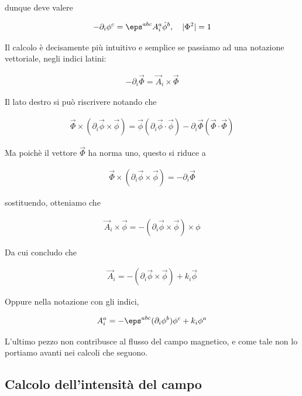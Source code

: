 \documentclass{report}
\begin{document}
dunque deve valere 

\begin{align}
    -\partial_i \phi^c = \eps^{abc}A^a_i \hat{\phi}^b, \quad |\Phi^2| = 1
\end{align}

Il calcolo è decisamente più intuitivo e semplice se passiamo ad una notazione vettoriale, negli indici latini: 

\begin{align}
    -\partial_i \vec{\Phi} = \vec{A}_i \times \vec{\Phi}
\end{align}

Il lato destro si può riscrivere notando che 

\begin{align}
    \vec{\Phi} \times (\partial_i \vec{\phi} \times \vec{\phi}) = \vec{\phi}(\partial_i \vec{\phi}\cdot \vec{\phi}) - \partial_i \vec{\Phi}(\vec{\Phi}\cdot \vec{\Phi})
\end{align}

Ma poichè il vettore \(\vec{\Phi}\) ha norma uno, questo si riduce a 

\begin{align}
    \vec{\Phi} \times (\partial_i \vec{\phi} \times \vec{\phi}) = -\partial_i \vec{\Phi}
\end{align}

sostituendo, otteniamo che 

\begin{align}
    \vec{A}_i \times \vec{\phi} = -(\partial_i \vec{\phi}\times \vec{\phi}) \times \phi
\end{align}

Da cui concludo che 

\begin{align}
    \vec{A}_i = -(\partial_i \vec{\phi}\times \vec{\phi}) + k_i \vec{\phi}
\end{align}

Oppure nella notazione con gli indici, 

\begin{align}
    A^a_i = -\eps^{abc}(\partial_i \phi^b)\phi^c + k_i \phi^a
\end{align}

L'ultimo pezzo non contribusce al flusso del campo magnetico, e come tale non lo portiamo avanti nei calcoli che seguono. 

\subsection{Calcolo dell'intensità del campo}
\end{document}
